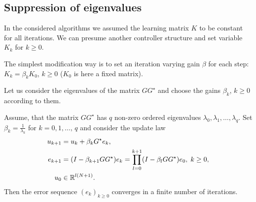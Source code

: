 \subsection{Suppression of eigenvalues} 

In the considered algorithms we assumed the learning matrix $K$ to be constant for all iterations.
We can presume another controller structure and set variable $K_k$ for $k\geq 0$. 

The simplest modification way is to set an iteration varying gain $\beta$ for each step: $K_k = \beta_k K_0$, $k\geq 0$ ($K_0$ is here a fixed matrix).

Let us consider the eigenvalues of the matrix $GG^\star$ and choose the gains $\beta_k$, $k \geq 0$ according to them. 

\begin{theo}
	Assume, that the matrix $GG^\star$ has $q$ non-zero ordered eigenvalues $\lambda_0, \lambda_1, \dots ,  \lambda_q$. Set $\beta_k = \frac{1}{\lambda_k}$ for $k = 0, 1, \dots, \, q$ and consider the update law
	\begin{align}
	\label{eq:cl_var0}
	\begin{split}
	u_{k+1} &= u_k + \beta_k G^\star e_k, \\
	e _{k+1} &= (I - \beta_{k+1}  GG^\star) e_{k}  = \prod_{l = 0}^{k+1} (I - \beta_{l}  GG^\star) e_0, \; k\geq 0,\\
	u_0 &\in {\mathbb{R}}^{l (N+1)}.
	\end{split}
	\end{align}
	Then the error sequence $(e_k)_{k\geq 0}$ converges in a finite number of iterations.     
\end{theo}
